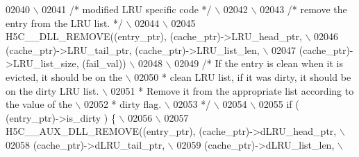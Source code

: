 \begin{DoxyCode}
02040 \textcolor{preprocessor}{                                                                             \(\backslash\)}
02041 \textcolor{preprocessor}{    }\textcolor{comment}{/* modified LRU specific code */}\textcolor{preprocessor}{                                         \(\backslash\)}
02042 \textcolor{preprocessor}{                                                                             \(\backslash\)}
02043 \textcolor{preprocessor}{    }\textcolor{comment}{/* remove the entry from the LRU list. */}\textcolor{preprocessor}{                                \(\backslash\)}
02044 \textcolor{preprocessor}{                                                                             \(\backslash\)}
02045 \textcolor{preprocessor}{    H5C\_\_DLL\_REMOVE((entry\_ptr), (cache\_ptr)->LRU\_head\_ptr,                  \(\backslash\)}
02046 \textcolor{preprocessor}{                    (cache\_ptr)->LRU\_tail\_ptr, (cache\_ptr)->LRU\_list\_len,    \(\backslash\)}
02047 \textcolor{preprocessor}{                    (cache\_ptr)->LRU\_list\_size, (fail\_val))                  \(\backslash\)}
02048 \textcolor{preprocessor}{                                                                             \(\backslash\)}
02049 \textcolor{preprocessor}{    }\textcolor{comment}{/* If the entry is clean when it is evicted, it should be on the         \(\backslash\)}
02050 \textcolor{comment}{     * clean LRU list, if it was dirty, it should be on the dirty LRU list.  \(\backslash\)}
02051 \textcolor{comment}{     * Remove it from the appropriate list according to the value of the     \(\backslash\)}
02052 \textcolor{comment}{     * dirty flag.                                                           \(\backslash\)}
02053 \textcolor{comment}{     */}\textcolor{preprocessor}{                                                                      \(\backslash\)}
02054 \textcolor{preprocessor}{                                                                             \(\backslash\)}
02055 \textcolor{preprocessor}{    if ( (entry\_ptr)->is\_dirty ) \{                                           \(\backslash\)}
02056 \textcolor{preprocessor}{                                                                             \(\backslash\)}
02057 \textcolor{preprocessor}{        H5C\_\_AUX\_DLL\_REMOVE((entry\_ptr), (cache\_ptr)->dLRU\_head\_ptr,         \(\backslash\)}
02058 \textcolor{preprocessor}{                            (cache\_ptr)->dLRU\_tail\_ptr,                      \(\backslash\)}
02059 \textcolor{preprocessor}{                            (cache\_ptr)->dLRU\_list\_len,                      \(\backslash\)}

\end{DoxyCode}
